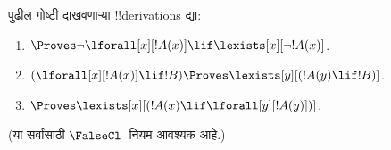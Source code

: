 \documentclass[../../../include/open-logic-section]{subfiles}
\begin{document}
\begin{prob}
पुढील गोष्टी दाखवणाऱ्या !!{derivation}s द्या:
\begin{enumerate}
\item $\Proves \lnot\lforall[x][!A(x)] \lif \lexists[x][\lnot!A(x)]$.
\item $(\lforall[x][!A(x)] \lif !B) \Proves \lexists[y][(!A(y) \lif !B)]$.
\item $\Proves \lexists[x][(!A(x) \lif \lforall[y][!A(y)])]$.
\end{enumerate}
(या सर्वांसाठी $\FalseCl$~नियम आवश्यक आहे.)
\end{prob}
\end{document}

